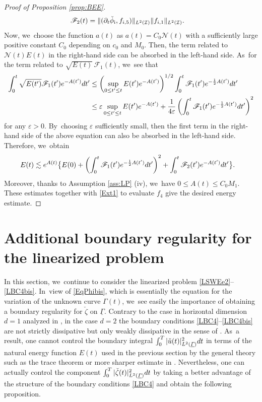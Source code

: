 \documentclass[11pt]{article}
\let\epsilon\varepsilon
\newcommand{\dt}{\partial_t}
\newcommand{\cI}{{\mathcal I}}
\newcommand{\ul}[1]{\underline{#1}}
\newcommand{\itGamma}{\mathit{\Gamma}}
\theoremstyle{definition}
\begin{document}
\begin{proof}[Proof of Proposition \ref{prop:BEE}]
\begin{align*}
\mathscr{F}_2(t)
&= \|(\dt\check{\phi}_\mathrm{i},f_{i,5})\|_{L^2(\cI)}\|f_{{\rm i},1}\|_{L^2(\cI)}.
\end{align*}
Now, we~choose the function $a(t)$ as $a(t)=C_0\mathscr{N}(t)$ with a sufficiently large positive constant $C_0$ depending on $c_0$ and $M_0$.
Then, the term related to $\mathscr{N}(t)E(t)$ in the right-hand side can be absorbed in the left-hand side. As~for the term related to $\sqrt{E(t)}\,\mathscr{F}_1(t)$, we~see that
\begin{align*}
\int_0^t \sqrt{E(t')}\mathscr{F}_1(t')e^{-A(t')} {\rm d}t'
&\leq \left(\sup_{0\leq t'\leq t} E(t')e^{-A(t')} \right)^{1/2}\int_0^t \mathscr{F}_1(t')e^{-\frac12A(t')}{\rm d}t' \\
&\leq \epsilon \sup_{0\leq t'\leq t} E(t')e^{-A(t')} + \frac{1}{4\epsilon}\left(\int_0^t \mathscr{F}_1(t')e^{-\frac12A(t')}{\rm d}t' \right)^2
\end{align*}
for any $\epsilon>0$. By~choosing $\epsilon$ sufficiently small, then the first term in the right-hand side of the above equation can also be absorbed in the left-hand side.
Therefore, we~obtain
\begin{align*}
E(t) &\lesssim e^{A(t)} \bigl\{ E(0) + \left(\int_0^t \mathscr{F}_1(t')e^{-\frac12A(t')}{\rm d}t' \right)^2
+ \int_0^t \mathscr{F}_2(t')e^{-A(t')} {\rm d}t' \bigr\}.
\end{align*}
Moreover, thanks to Assumption \ref{ass:LP} (iv), we~have $0\leq A(t)\leq C_0M_1$.
These estimates together with \eqref{Ext1} to evaluate $f_4$ give the desired energy estimate.
\end{proof}

\section{Additional boundary regularity for the linearized problem}\label{sect:AddBR}
In this section, we~continue to consider the linearized problem \eqref{LSWEe2}--\eqref{LBC4bis}. In~view of \eqref{EqPhibis}, which is essentially the equation for the variation of the unknown curve $\itGamma(t)$, we~see easily the importance of obtaining a boundary regularity for $\check{\zeta}$ on $\ul{\itGamma}$.
Contrary to the case in horizontal dimension $d=1$ analyzed in \cite{IguchiLannes2021},
in the case $d=2$ the boundary conditions \eqref{LBC4}--\eqref{LBC4bis} are not strictly dissipative but only weakly dissipative
in the sense of \cite{IguchiLannes2023}. As~a result, one cannot control the boundary integral $\int_0^T|\check{u}(t)|_{L^2(\ul{\itGamma})}^2 {\rm d}t$ in terms of the natural energy function $E(t)$
used in the previous section by the general theory such as the trace theorem or more sharper estimate in \cite{Tataru1998}.
Nevertheless, one can actually control the component $\int_0^T|\check{\zeta}(t)|_{L^2(\ul{\itGamma})}^2 {\rm d}t$ by taking a better advantage of the structure
of the boundary conditions \eqref{LBC4} and obtain the following proposition.
\end{document}
